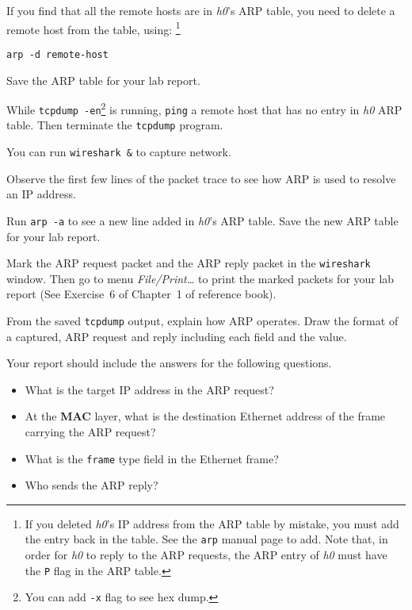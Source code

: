 \documentclass{../UTNetLab}
\begin{document}
    If you find that all the remote hosts are in \textit{h0}’s ARP table, you need to delete a remote host from the table, using:
    \footnote{If you deleted \textit{h0}’s IP address from the ARP table by mistake, you must add the entry back in the table.
    See the \lstinline{arp} manual page to add.
    Note that, in order for \textit{h0} to reply to the ARP requests, the ARP entry of \textit{h0} must have the \lstinline{P} flag in the ARP table.}
    \begin{lstlisting}[emph={remote-host}]
arp -d remote-host
    \end{lstlisting}

    Save the ARP table for your lab report.
    
    While \lstinline{tcpdump -en}\footnote{You can add \lstinline{-x} flag to see hex dump.} is running, \lstinline{ping} a remote host that has no entry in \textit{h0} ARP table.
    Then terminate the \lstinline{tcpdump} program.

    You can run \lstinline{wireshark &} to capture network.

    Observe the first few lines of the packet trace to see how ARP is used to resolve an IP address.

    Run \lstinline{arp -a} to see a new line added in \textit{h0}’s ARP table.
    Save the new ARP table for your lab report.

    Mark the ARP request packet and the ARP reply packet in the \lstinline{wireshark} window.
    Then go to menu \textit{File/Print\ldots} to print the marked packets for your lab report (See Exercise~6 of Chapter~1 of reference book).

    \begin{report}
        \item From the saved \lstinline{tcpdump} output, explain how ARP operates.
            Draw the format of a captured, ARP request and reply including each field and the value.
    \end{report}

    Your report should include the answers for the following questions.
    \begin{itemize}
        \item What is the target IP address in the ARP request?
        \item At the \textbf{MAC} layer, what is the destination Ethernet address of the frame carrying the ARP request?
        \item What is the \texttt{frame} type field in the Ethernet frame?
        \item Who sends the ARP reply?
    \end{itemize}
\end{document}
